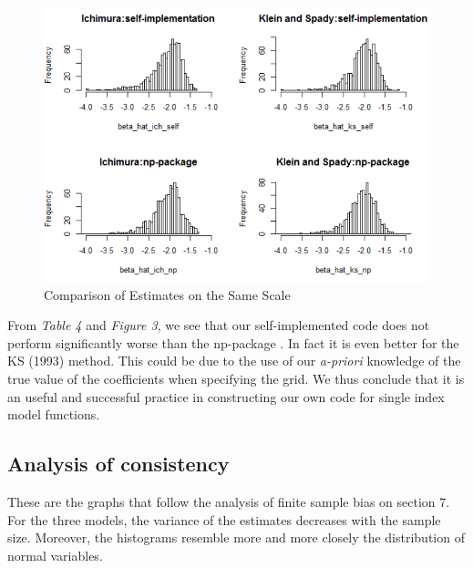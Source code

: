 \documentclass[a4paper]{article}
\begin{document}
\begin{figure}[h!]
  \includegraphics[width=\linewidth]{compare_done.png}
 
  \label{fig:comparison of estimates on the same scale}
    \caption{Comparison of Estimates on the Same Scale}

\end{figure}


From \textit{Table 4} and \textit{Figure 3}, we see that our self-implemented code does not perform significantly worse than the np-package \cite{[28]}. In fact it is even better for the KS (1993) \cite{[12]} method. This could be due to the use of our \textit{a-priori} knowledge of the true value of the coefficients when specifying the grid. We thus conclude that it is an useful and successful practice in constructing our own code for single index model functions.

\subsection{Analysis of consistency}
These are the graphs that follow the analysis of finite sample bias on section 7. For the three models, the variance of the estimates decreases with the sample size. Moreover, the histograms resemble more and more closely the distribution of normal variables.
\end{document}
